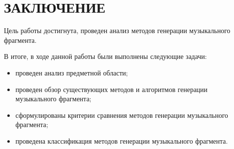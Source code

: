 \chapter*{ЗАКЛЮЧЕНИЕ}


Цель работы достигнута, проведен анализ методов генерации музыкального фрагмента.

В итоге, в ходе данной работы были выполнены следующие задачи:
\begin{itemize}
	\item проведен анализ предметной области;
	\item проведен обзор существующих методов и алгоритмов генерации музыкального фрагмента;
	\item сформулированы критерии сравнения методов генерации музыкального фрагмента;
	\item проведена классификация методов генерации музыкального фрагмента.	
\end{itemize}


